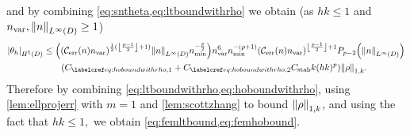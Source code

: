 and by combining \cref{eq:sntheta,eq:ltboundwithrho} we obtain (as $hk \leq 1$ and $\nvar,\NLiD{n} \geq 1$)
\begin{align}
\SNHoD{\thetah} &\leq
\mleft(\mleft(\En\nvar\mright)^{\half(\floor{\frac{p-1}2}+1)}\NLiD{n}\nmin^{-\frac{p}2}\mright)\nvar^6\nmin^{-(p+1)} \mleft(\En \nvar\mright)^{\floor{\frac{p-1}2}+1}\Pfn{p-2}\mleft(\NLiD{n}\mright)\nonumber\\
&\quad\quad\mleft(\CHoboundo  +\CHoboundt \CAnk k(hk)^p\mright)\NW{\rho}.\label{eq:hoboundwithrho}
\end{align}
Therefore by combining \cref{eq:ltboundwithrho,eq:hoboundwithrho}, using \cref{lem:ellprojerr} with $m=1$ and \cref{lem:scottzhang} to bound $\NW{\rho}$, and using the fact that $hk \leq 1,$ we obtain \cref{eq:femltbound,eq:femhobound}.
\epf
{}

